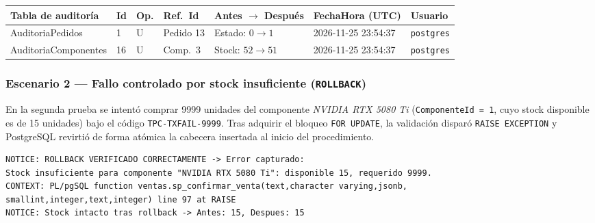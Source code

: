 \begin{center}
\label{tab:tx-commit-auditoria}
\begin{tablaAPA}
\footnotesize
\begin{tabular}{L{3.5cm} R{0.8cm} C{0.9cm} R{1.6cm} C{2.2cm} L{3.6cm} L{1.6cm}}
\toprule
\textbf{Tabla de auditor\'ia} & \textbf{Id} & \textbf{Op.} & \textbf{Ref.\ Id} & \textbf{Antes $\to$ Despu\'es} & \textbf{FechaHora (UTC)} & \textbf{Usuario} \\
\midrule
AuditoriaPedidos     & 1  & U & Pedido 13 & Estado: $0 \to 1$ & 2026-11-25 23:54:37 & \texttt{postgres} \\
AuditoriaComponentes & 16 & U & Comp.\ 3  & Stock: $52 \to 51$ & 2026-11-25 23:54:37 & \texttt{postgres} \\
\bottomrule
\end{tabular}
\end{tablaAPA}
\end{center}

\subsubsection{Escenario 2 --- Fallo controlado por stock insuficiente (\texttt{ROLLBACK})}

En la segunda prueba se intent\'o comprar 9999 unidades del componente \textit{NVIDIA RTX 5080 Ti} (\texttt{ComponenteId = 1}, cuyo stock disponible es de 15 unidades) bajo el c\'odigo \texttt{TPC-TXFAIL-9999}.
Tras adquirir el bloqueo \texttt{FOR UPDATE}, la validaci\'on dispar\'o \texttt{RAISE EXCEPTION} y PostgreSQL revirti\'o de forma at\'omica la cabecera insertada al inicio del procedimiento.

\begin{lstlisting}[style=terminal, caption={Mensaje real devuelto por PostgreSQL en la prueba de ROLLBACK}, label=lst:tx-rollback-msg]
NOTICE: ROLLBACK VERIFICADO CORRECTAMENTE -> Error capturado:
Stock insuficiente para componente "NVIDIA RTX 5080 Ti": disponible 15, requerido 9999.
CONTEXT: PL/pgSQL function ventas.sp_confirmar_venta(text,character varying,jsonb,
smallint,integer,text,integer) line 97 at RAISE
NOTICE: Stock intacto tras rollback -> Antes: 15, Despues: 15
\end{lstlisting}

